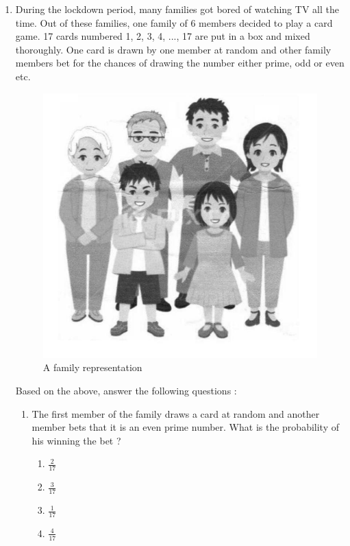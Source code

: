 \documentclass{article}
\begin{document}
\begin{enumerate}

\item During the lockdown period, many families got bored of watching TV all the time. Out of these families, one family of 6 members decided to play a card game. 17 cards numbered 1, 2, 3, 4, ..., 17 are put in a box and mixed thoroughly. One card is drawn by one member at random and other family members bet for the chances of drawing the number either prime, odd or even etc.     
	
	\begin{figure}[h!]
	\centering
	\includegraphics[width=\columnwidth]{figs/1.jpg}
	\caption{A family representation}
	\label{fig:1}
	\end{figure} 
Based on the above, answer the following questions : 		
\begin{enumerate}
\item The first member of the family draws a card at random and another member bets that it is an even prime number. What is the probability of his winning the bet ? 
	\begin{enumerate}
	\item $\frac{2}{17}$
	\item $\frac{3}{17}$
	\item $\frac{1}{17}$ 
	\item $\frac{4}{17}$ 
	\end{enumerate}

\end{enumerate}
\end{enumerate}
\end{document}
